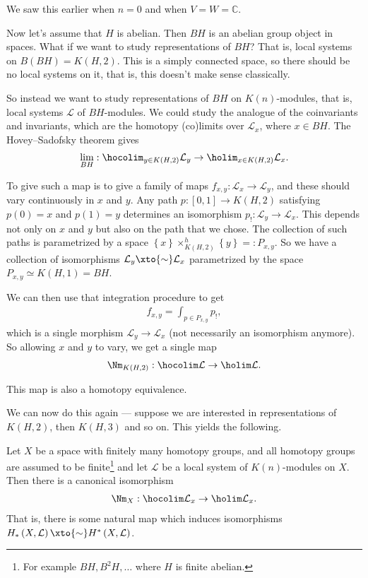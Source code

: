We saw this earlier when $n=0$ and when $V=W= \mathbb{C}$.

Now let's assume that $H$ is abelian. Then $BH$ is an abelian group object in spaces. What if we want to study representations of $BH$? That is, local systems on $B(BH) = K(H,2)$. This is a simply connected space, so there should be no local systems on it, that is, this doesn't make sense classically.

So instead we want to study representations of $BH$ on $K(n)$-modules, that is, local systems $\mathcal{L}$ of $BH$-modules. We could study the analogue of the coinvariants and invariants, which are the homotopy (co)limits over $\mathcal{L}_x$, where $x\in BH$. The Hovey--Sadofsky theorem gives
\begin{align*}
    \lim_{BH} : \hocolim_{y\in K(H,2)} \mathcal{L}_y \to \holim_{x\in K(H,2)} \mathcal{L}_x.
\end{align*}

To give such a map is to give a family of maps $f_{x,y} : \mathcal{L}_x \to \mathcal{L}_y$, and these should vary continuously in $x$ and $y$. Any path $p: [0,1] \to K(H,2)$ satisfying $p(0) = x$ and $p(1) = y$ determines an isomorphism $p_! : \mathcal{L}_y \to \mathcal{L}_x$. This depends not only on $x$ and $y$ but also on the path that we chose. The collection of such paths is parametrized by a space $\left\{ x \right\} \times^h_{K(H,2)} \left\{ y \right\}=: P_{x,y}$. So we have a collection of isomorphisms $\mathcal{L}_y \xto{\sim} \mathcal{L}_x$ parametrized by the space $P_{x,y} \simeq K(H,1) = BH$.

We can then use that integration procedure to get
\begin{align*}
    f_{x,y} = \int_{p \in P_{x,y}} p_!,
\end{align*}
which is a single morphism $\mathcal{L}_y \to \mathcal{L}_x$ (not necessarily an isomorphism anymore). So allowing $x$ and $y$ to vary, we get a single map
\begin{align*}
    \Nm_{K(H,2)} : \hocolim \mathcal{L} \to \holim \mathcal{L}.
\end{align*}

\begin{theorem} This map is also a homotopy equivalence.
\end{theorem}

We can now do this again --- suppose we are interested in representations of $K(H,2)$, then $K(H,3)$ and so on. This yields the following.

\begin{theorem} Let $X$ be a space with finitely many homotopy groups, and all homotopy groups are assumed to be finite\footnote{For example $BH, B^2 H, \ldots $ where $H$ is finite abelian.} and let $\mathcal{L}$ be a local system of $K(n)$-modules on $X$. Then there is a canonical isomorphism
\begin{align*}
    \Nm_X : \hocolim \mathcal{L}_x \to \holim \mathcal{L}_x.
\end{align*}
That is, there is some natural map which induces isomorphisms $H_\ast \left( X, \mathcal{L} \right) \xto{\sim} H^\ast \left( X, \mathcal{L} \right)$.
\end{theorem}

